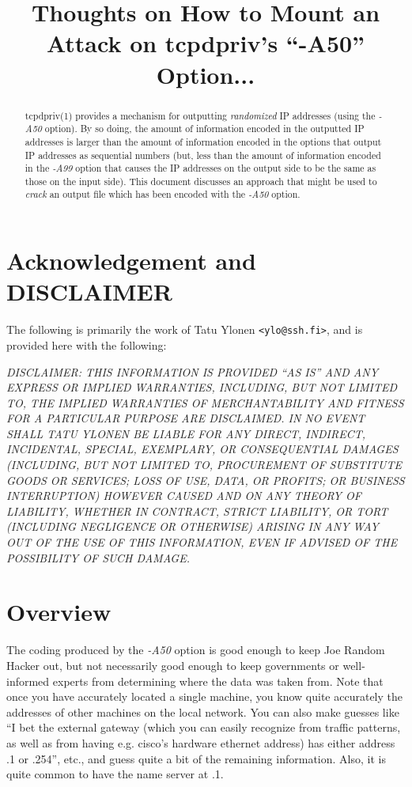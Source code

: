 \documentclass[10pt,onecolumn]{article}
\begin{document}
\title{Thoughts on How to Mount an Attack on tcpdpriv's ``-A50'' Option...}


\maketitle

\begin{abstract}
tcpdpriv(1) provides a mechanism for outputting \emph{randomized} IP
addresses (using the \emph{-A50} option).
By so doing, the amount of information encoded in the
outputted IP addresses is larger than the amount of information encoded
in the options that output IP addresses as sequential numbers (but,
less than the amount of information encoded in the \emph{-A99} option
that causes the IP addresses on the output side to be the same as those
on the input side).  This document discusses an approach that might be
used to \emph{crack} an output file which has been encoded with the
\emph{-A50} option.
\end{abstract}

\section{Acknowledgement and DISCLAIMER}

The following is primarily the work of Tatu Ylonen \texttt{<ylo@ssh.fi>}, and
is provided here with the following:

\emph{
DISCLAIMER:
THIS INFORMATION IS PROVIDED ``AS IS'' AND ANY EXPRESS OR IMPLIED
WARRANTIES, INCLUDING, BUT NOT LIMITED TO, THE IMPLIED WARRANTIES
OF MERCHANTABILITY AND FITNESS FOR A PARTICULAR PURPOSE ARE
DISCLAIMED.  IN NO EVENT SHALL TATU YLONEN BE LIABLE
FOR ANY DIRECT, INDIRECT, INCIDENTAL, SPECIAL, EXEMPLARY, OR
CONSEQUENTIAL DAMAGES (INCLUDING, BUT NOT LIMITED TO, PROCUREMENT
OF SUBSTITUTE GOODS OR SERVICES; LOSS OF USE, DATA, OR PROFITS; OR
BUSINESS INTERRUPTION) HOWEVER CAUSED AND ON ANY THEORY OF LIABILITY,
WHETHER IN CONTRACT, STRICT LIABILITY, OR TORT (INCLUDING NEGLIGENCE
OR OTHERWISE) ARISING IN ANY WAY OUT OF THE USE OF THIS INFORMATION,
EVEN IF ADVISED OF THE POSSIBILITY OF SUCH DAMAGE.
}


\section{Overview}

The coding produced by the \emph{-A50} option is good enough to
keep Joe Random Hacker out, but not
necessarily good enough to keep governments or well-informed experts
from determining where the data was taken from.  Note that once
you have accurately located a single machine, you know quite
accurately the addresses of other machines on the local network.
You can also make guesses like ``I bet the external gateway (which
you can easily recognize from traffic patterns, as well as from
having e.g. cisco's hardware ethernet address) has either address
.1 or .254'', etc., and guess quite a bit of the remaining information.
Also, it is quite common to have the name server at .1.
\end{document}
